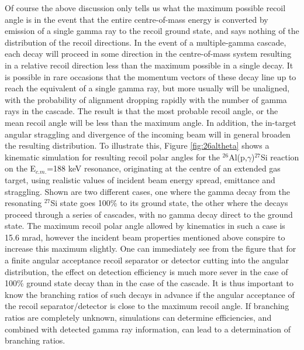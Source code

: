 Of course the above discussion only tells us what the maximum possible recoil angle is in the event that the entire centre-of-mass energy is converted by emission of a single gamma ray to the recoil ground state, and says nothing of the distribution of the recoil directions. In the event of a multiple-gamma cascade, each decay will proceed in some direction in the centre-of-mass system resulting in a relative recoil direction less than the maximum possible in a single decay. It is possible in rare occasions that the momentum vectors of these decay line up to reach the equivalent of a single gamma ray, but more usually will be unaligned, with the probability of alignment dropping rapidly with the number of gamma rays in the cascade. The result is that the most probable recoil angle, or the mean recoil angle will be less than the maximum angle. In addition, the in-target angular straggling and divergence of the incoming beam will in general broaden the resulting distribution.
To illustrate this, Figure \ref{fig:26altheta} shows a kinematic simulation for resulting recoil polar angles for the $^{26}$Al(p,$\gamma$)$^{27}$Si reaction on the E$_{c.m.}$=188 keV resonance, originating at the centre of an extended gas target, using realistic values of incident beam energy spread, emittance and straggling. Shown are two different cases, one where the gamma decay from the resonating $^{27}$Si state goes 100$\%$ to its ground state, the other where the decays proceed through a series of cascades, with no gamma decay direct to the ground state. The maximum recoil polar angle allowed by kinematics in such a case is 15.6 mrad, however the incident beam properties mentioned above conspire to increase this maximum slightly. 
One can immediately see from the figure that for a finite angular acceptance recoil separator or detector cutting into the angular distribution, the effect on detection efficiency is much more sever in the case of 100\% ground state decay than in the case of the cascade. It is thus important to know the branching ratios of such decays in advance if the angular acceptance of the recoil separator/detector is close to the maximum recoil angle. If branching ratios are completely unknown, simulations can determine efficiencies, and combined with detected gamma ray information, can lead to a determination of branching ratios.    

